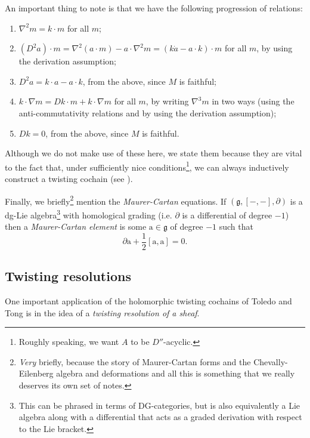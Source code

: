 \documentclass[11pt,notitlepage]{article}
\numberwithin{equation}{subsection}
\begin{document}
                An important thing to note is that we have the following progression of relations:
                \begin{enumerate}
                    \item $\nabla^2m = k\cdot m$ for all $m$;
                    \item $(D^2a)\cdot m = \nabla^2(a\cdot m)-a\cdot\nabla^2m = (k\dot a-a\cdot k)\cdot m$ for all $m$, by using the derivation assumption;
                    \item $D^2a=k\cdot a-a\cdot k$, from the above, since $M$ is faithful;
                    \item $k\cdot\nabla m = Dk\cdot m+k\cdot\nabla m$ for all $m$, by writing $\nabla^3m$ in two ways (using the anti-commutativity relations and by using the derivation assumption);
                    \item $Dk=0$, from the above, since $M$ is faithful.
                \end{enumerate}
                Although we do not make use of these here, we state them because they are vital to the fact that, under sufficiently nice conditions\footnote{Roughly speaking, we want $A$ to be $D''$-acyclic.}, we can always inductively construct a twisting cochain (see \cite[Lemma~8.13]{Toledo:1976gy}).

                \bigskip

                Finally, we briefly\footnote{\emph{Very} briefly, because the story of Maurer-Cartan forms and the Chevally-Eilenberg algebra and deformations and all this is something that we really deserves its own set of notes.} mention the \textit{Maurer-Cartan} equations.
                If $(\mathfrak{g},[-,-],\partial)$ is a dg-Lie algebra\footnote{This can be phrased in terms of DG-categories, but is also equivalently a Lie algebra along with a differential that acts as a graded derivation with respect to the Lie bracket.} with homological grading (i.e. $\partial$ is a differential of degree $-1$) then a \textit{Maurer-Cartan element} is some $\mathrm{a}\in\mathfrak{g}$ of degree $-1$ such that
                \[
                    \partial\mathrm{a}+\frac12[\mathrm{a},\mathrm{a}]=0.
                \]

            \subsection{Twisting resolutions}\label{ssub:twisting-resolutions}

                One important application of the holomorphic twisting cochains of Toledo and Tong is in the idea of a \emph{twisting resolution of a sheaf}.
                
\end{document}
